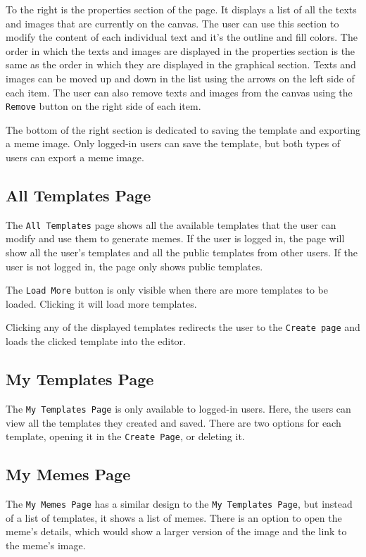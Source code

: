 To the right is the properties section of the page. It displays a list of all the texts and images that are currently on the canvas. The user can use this section to modify the content of each individual text and it's the outline and fill colors. The order in which the texts and images are displayed in the properties section is the same as the order in which they are displayed in the graphical section. Texts and images can be moved up and down in the list using the arrows on the left side of each item. The user can also remove texts and images from the canvas using the \texttt{Remove} button on the right side of each item.

The bottom of the right section is dedicated to saving the template and exporting a meme image. Only logged-in users can save the template, but both types of users can export a meme image.

\subsection{All Templates Page}

The \texttt{All Templates} page shows all the available templates that the user can modify and use them to generate memes. If the user is logged in, the page will show all the user's templates and all the public templates from other users. If the user is not logged in, the page only shows public templates.

The \texttt{Load More} button is only visible when there are more templates to be loaded. Clicking it will load more templates.

Clicking any of the displayed templates redirects the user to the \texttt{Create page} and loads the clicked template into the editor.

\subsection{My Templates Page}

The \texttt{My Templates Page} is only available to logged-in users. Here, the users can view all the templates they created and saved. There are two options for each template, opening it in the \texttt{Create Page}, or deleting it.

\subsection{My Memes Page}

The \texttt{My Memes Page} has a similar design to the \texttt{My Templates Page}, but instead of a list of templates, it shows a list of memes. There is an option to open the meme's details, which would show a larger version of the image and the link to the meme's image.

